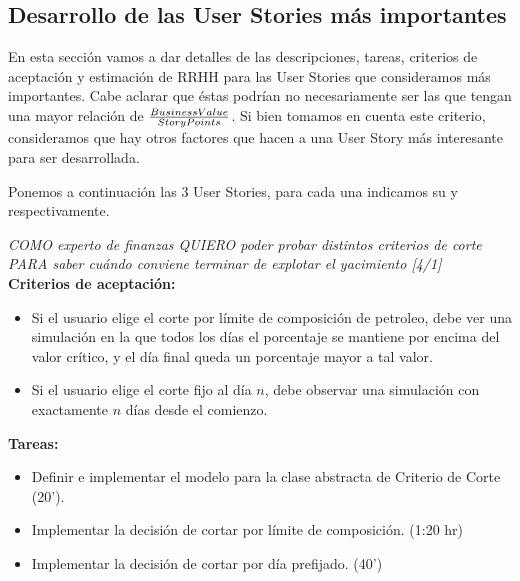 \newpage
\subsection{Desarrollo de las User Stories más importantes}

En esta sección vamos a dar detalles de las descripciones, tareas, criterios de aceptación y estimación de RRHH para las User Stories que consideramos más importantes. Cabe aclarar que éstas podrían no necesariamente ser las que tengan una mayor relación de \( \frac{Business Value{}}{Story Points{}} \). Si bien tomamos en cuenta este criterio, consideramos que hay otros factores que hacen a una User Story más interesante para ser desarrollada. 

Ponemos a continuación las 3 User Stories, para cada una indicamos su 
\BV{} y \SP{} respectivamente. 

\begin{tcolorbox}
\textit{COMO experto de finanzas QUIERO poder probar distintos criterios de corte PARA saber cuándo conviene terminar de explotar el yacimiento [4/1]}\\

\textbf{Criterios de aceptación:}
\begin{itemize}
	\item Si el usuario elige el corte por límite de composición de petroleo, debe ver una simulación en la que todos los días el porcentaje se mantiene por encima del valor crítico, y el día final queda un porcentaje mayor a tal valor.
    \item Si el usuario elige el corte fijo al día $n$, debe observar una simulación con exactamente $n$ días desde el comienzo.
\end{itemize}

\textbf{Tareas:}
\begin{itemize}
	\item Definir e implementar el modelo para la clase abstracta de 
    Criterio de Corte (20').
    \item Implementar la decisión de cortar por límite de composición. (1:20 hr)
    \item Implementar la decisión de cortar por día prefijado. (40')
\end{itemize}
\end{tcolorbox}

